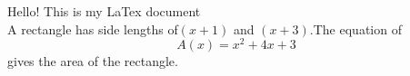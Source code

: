 \documentclass[12pt]{article}
\begin{document}
Hello! This is my LaTex document\\
A rectangle has side lengths of$(x+1)$ and $(x+3)$.The equation of $${A(x)=x^2+4x+3}$$ gives the area of the rectangle.
\end{document}

